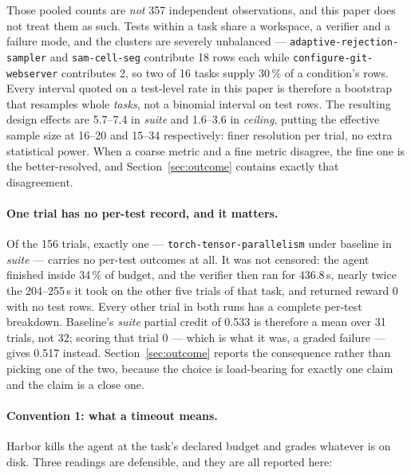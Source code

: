 \documentclass[11pt,a4paper]{article}
\newcommand{\task}[1]{\texttt{\footnotesize #1}}
\begin{document}
Those pooled counts are \emph{not} 357 independent observations, and this paper does not treat
them as such. Tests within a task share a workspace, a verifier and a failure mode, and the
clusters are severely unbalanced --- \task{adaptive-rejection-sampler} and \task{sam-cell-seg}
contribute 18 rows each while \task{configure-git-webserver} contributes 2, so two of 16 tasks
supply 30\,\% of a condition's rows. Every interval quoted on a test-level rate in this paper
is therefore a bootstrap that resamples whole \emph{tasks}, not a binomial interval on test
rows. The resulting design effects are 5.7--7.4 in \emph{suite} and 1.6--3.6 in
\emph{ceiling}, putting the effective sample size at 16--20 and 15--34 respectively: finer
resolution per trial, no extra statistical power. When a coarse metric and a fine metric
disagree, the fine one is the better-resolved, and Section~\ref{sec:outcome} contains exactly
that disagreement.

\paragraph{One trial has no per-test record, and it matters.} Of the 156 trials, exactly one
--- \task{torch-tensor-parallelism} under baseline in \emph{suite} --- carries no per-test
outcomes at all. It was not censored: the agent finished inside 34\,\% of budget, and the
verifier then ran for 436.8\,s, nearly twice the 204--255\,s it took on the other five trials
of that task, and returned reward 0 with no test rows. Every other trial in both runs has a
complete per-test breakdown. Baseline's \emph{suite} partial credit of 0.533 is therefore a
mean over 31 trials, not 32; scoring that trial 0 --- which is what it was, a graded failure
--- gives 0.517 instead. Section~\ref{sec:outcome} reports the consequence rather than picking
one of the two, because the choice is load-bearing for exactly one claim and the claim is a
close one.

\paragraph{Convention 1: what a timeout means.} Harbor kills the agent at the task's declared
budget and grades whatever is on disk. Three readings are defensible, and they are all
reported here:
\end{document}
